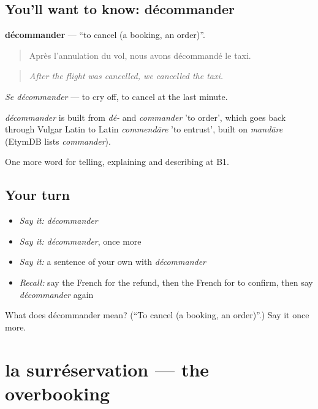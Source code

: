 \subsection*{You'll want to know: décommander}
\textbf{décommander} — \textquotedblleft{}to cancel (a booking, an order)\textquotedblright{}.

\begin{quote}
Après l'annulation du vol, nous avons décommandé le taxi.
\end{quote}

\begin{quote}
\emph{After the flight was cancelled, we cancelled the taxi.}
\end{quote}

\emph{Se décommander} — to cry off, to cancel at the last minute.

\begin{cousinweb}
\emph{décommander} is built from \emph{dé-} and \emph{commander} 'to order', which goes back through Vulgar Latin to Latin \emph{commendāre} 'to entrust', built on \emph{mandāre} (EtymDB lists \emph{commander}).
\end{cousinweb}

\begin{grammarlens}[title={What you've built}]
One more word for telling, explaining and describing at B1.
\end{grammarlens}

\subsection*{Your turn}
\begin{itemize}
\raggedright
  \item \emph{Say it:} \emph{décommander}
  \item \emph{Say it:} \emph{décommander}, once more
  \item \emph{Say it:} a sentence of your own with \emph{décommander}
  \item \emph{Recall:} say the French for the refund, then the French for to confirm, then say \emph{décommander} again
\end{itemize}

\begin{tcolorbox}[breakable,colback=teal!4,colframe=teal!35!black,title={Before you move on}]
What does décommander mean? (\textquotedblleft{}To cancel (a booking, an order)\textquotedblright{}.) Say it once more.
\end{tcolorbox}
\section[la surréservation]{la surréservation — the overbooking}

